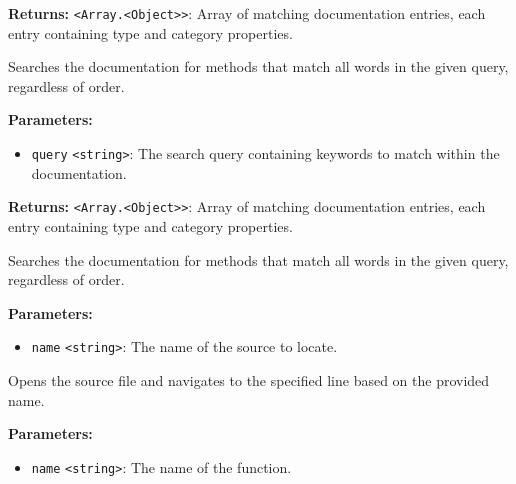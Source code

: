 \documentclass[12pt,a4paper]{article}
\begin{document}
\noindent \textbf{Returns:} \texttt{<Array.<Object>>}: Array of matching documentation entries, each entry containing \textasciigrave{}type\textasciigrave{} and \textasciigrave{}category\textasciigrave{} properties.

\noindent Searches the documentation for methods that match all words in the given query, regardless of order.

\vspace{5mm}
\noindent {}


\noindent \textbf{Parameters:}
\begin{itemize}
  \item \texttt{query} \texttt{<string>}: The search query containing keywords to match within the documentation.
\end{itemize}

\noindent \textbf{Returns:} \texttt{<Array.<Object>>}: Array of matching documentation entries, each entry containing \textasciigrave{}type\textasciigrave{} and \textasciigrave{}category\textasciigrave{} properties.

\noindent Searches the documentation for methods that match all words in the given query, regardless of order.

\vspace{5mm}
\noindent {}


\noindent \textbf{Parameters:}
\begin{itemize}
  \item \texttt{name} \texttt{<string>}: The name of the source to locate.
\end{itemize}

\noindent Opens the source file and navigates to the specified line based on the provided name.

\vspace{5mm}
\noindent {}


\noindent \textbf{Parameters:}
\begin{itemize}
  \item \texttt{name} \texttt{<string>}: The name of the function.
\end{itemize}
\end{document}
